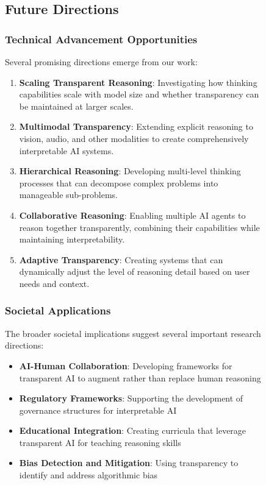 \begin{table}[H]
\begin{figure}[H]
\subsection{Future Directions}

\subsubsection{Technical Advancement Opportunities}
Several promising directions emerge from our work:

\begin{enumerate}
    \item \textbf{Scaling Transparent Reasoning}: Investigating how thinking capabilities scale with model size and whether transparency can be maintained at larger scales.
    
    \item \textbf{Multimodal Transparency}: Extending explicit reasoning to vision, audio, and other modalities to create comprehensively interpretable AI systems.
    
    \item \textbf{Hierarchical Reasoning}: Developing multi-level thinking processes that can decompose complex problems into manageable sub-problems.
    
    \item \textbf{Collaborative Reasoning}: Enabling multiple AI agents to reason together transparently, combining their capabilities while maintaining interpretability.
    
    \item \textbf{Adaptive Transparency}: Creating systems that can dynamically adjust the level of reasoning detail based on user needs and context.
\end{enumerate}

\subsubsection{Societal Applications}
The broader societal implications suggest several important research directions:

\begin{itemize}
    \item \textbf{AI-Human Collaboration}: Developing frameworks for transparent AI to augment rather than replace human reasoning
    \item \textbf{Regulatory Frameworks}: Supporting the development of governance structures for interpretable AI
    \item \textbf{Educational Integration}: Creating curricula that leverage transparent AI for teaching reasoning skills
    \item \textbf{Bias Detection and Mitigation}: Using transparency to identify and address algorithmic bias
\end{itemize}


\end{figure}
\end{table}
